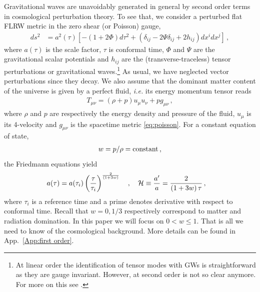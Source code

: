 \documentclass[aps,10pt,prd,groupedaddress,nofootinbib,notitlepage,eqsecnum,preprintnumbers]{revtex4-1}
\begin{document}
Gravitational waves are unavoidably generated in general by second order terms in cosmological perturbation theory. To see that, we consider a perturbed flat FLRW metric in the zero shear (or Poisson) gauge,
\begin{align}\label{eq:poisson}
ds^2&=a^2(\tau)\left[-(1+2\Phi)d\tau^2+\left(\delta_{ij}-2\Psi\delta_{ij}+2h_{ij}\right)dx^idx^j\right]\,,
\end{align}
where $a(\tau)$ is the scale factor, $\tau$ is conformal time, $\Phi$ and $\Psi$ are the gravitational scalar potentials and $h_{ij}$ are the (transverse-traceless) tensor perturbations or gravitational waves.\footnote{At linear order the identification of tensor modes with GWs is straightforward as they are gauge invariant. However, at second order is not so clear anymore. For more on this see \cite{Arroja:2009sh,Hwang:2017oxa}.} As usual, we have neglected vector perturbations since they decay. We also assume that the dominant matter content of the universe is given by a perfect fluid, \textit{i.e.} its energy momentum tensor reads
\begin{align}
T_{\mu\nu}=(\rho+p)u_{\mu}u_{\nu}+pg_{\mu\nu}\,,
\end{align}
where $\rho$ and $p$ are respectively the energy density and pressure of the fluid, $u_{\mu}$ is its 4-velocity and $g_{\mu\nu}$ is the spacetime metric \eqref{eq:poisson}. For a constant equation of state,
\begin{align}
w=p/\rho={\rm constant}\,,
\end{align}
the Friedmann equations yield
\begin{align}\label{eq:background}
a(\tau)=a(\tau_i)\left(\frac{\tau}{\tau_i}\right)^{\frac{2}{\left(1+3w\right)}}\quad,\quad{\cal H}&\equiv\frac{a'}{a}=\frac{2}{\left(1+3w\right)\tau}\,,
\end{align}
where $\tau_i$ is a reference time and a prime denotes derivative with respect to conformal time. Recall that $w=0,1/3$ respectively correspond to matter and radiation domination. In this paper we will focus on $0<w\leq1$. That is all we need to know of the cosmological background. More details can be found in App.~\ref{App:first order}.
\end{document}
